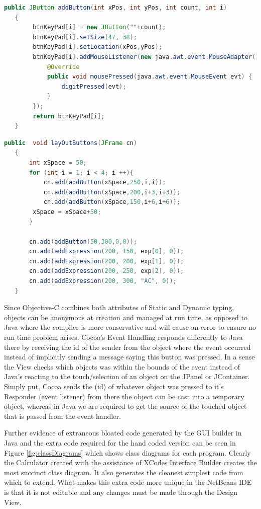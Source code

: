 \documentclass[a4paper,14pt]{article}
\begin{document}
\begin{lstlisting}[caption={Create Button - Java},language=Java,label=addButtonJava,]
public JButton addButton(int xPos, int yPos, int count, int i)
   {
        btnKeyPad[i] = new JButton(""+count);
        btnKeyPad[i].setSize(47, 38);
        btnKeyPad[i].setLocation(xPos,yPos);
        btnKeyPad[i].addMouseListener(new java.awt.event.MouseAdapter() {
            @Override
            public void mousePressed(java.awt.event.MouseEvent evt) {
                digitPressed(evt);
            }
        });              
        return btnKeyPad[i];
   }
\end{lstlisting}
\begin{lstlisting}[caption={Lay Out Buttons - Java},language=Java,label=layOutButtons,]
public  void layOutButtons(JFrame cn)
   {
       int xSpace = 50;
       for (int i = 1; i < 4; i ++){
           cn.add(addButton(xSpace,250,i,i));
           cn.add(addButton(xSpace,200,i+3,i+3));
           cn.add(addButton(xSpace,150,i+6,i+6));
        xSpace = xSpace+50;
       }
       
       cn.add(addButton(50,300,0,0));
       cn.add(addExpression(200, 150, exp[0], 0));
       cn.add(addExpression(200, 200, exp[1], 0));
       cn.add(addExpression(200, 250, exp[2], 0));
       cn.add(addExpression(200, 300, "AC", 0));
   }
\end{lstlisting}
Since Objective-C combines both attributes of Static and Dynamic typing, objects can be anonymous at creation and managed at run time, as opposed to Java where the compiler is more conservative and will cause an error to ensure no run time problem arises. Cocoa's Event Handling responds differently to Java there by receiving the id of the sender from the object where the event occurred instead of implicitly sending a message saying this button was pressed. In a sense the View checks which objects was within the bounds of the event instead of Java's reacting to the touch/selection of an object on the JPanel or JContainer. Simply put, Cocoa sends the (id) of whatever object was pressed to it's Responder (event listener) from there the object can be cast into a temporary object, whereas in Java we are required to get the source of the touched object that is passed from the event handler.

Further evidence of extraneous bloated code generated by the GUI builder in Java and the extra code required for the hand coded version can be seen in Figure \ref{fig:classDiagrams} which shows class diagrams for each program. Clearly the Calculator created with the assistance of XCodes Interface Builder creates the most succinct class diagram. It also generates the cleanest simplest code from which to extend. What makes this extra code more unique in the NetBeans IDE is that it is not editable and any changes must be made through the Design View.
\end{document}
